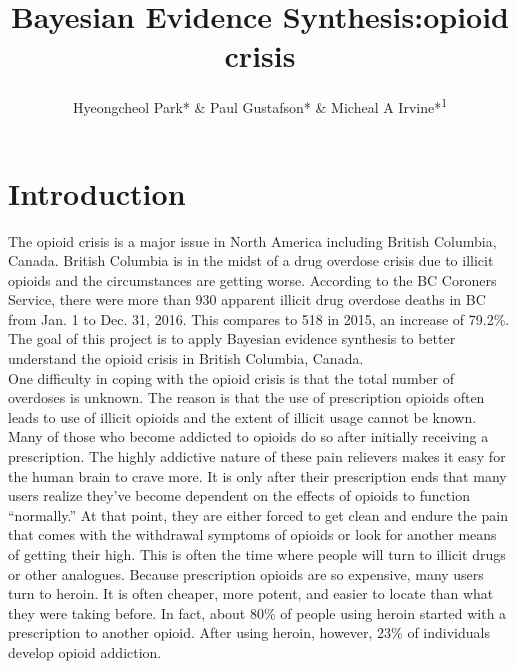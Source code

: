 \documentclass[12pt]{article}
\title{Bayesian Evidence Synthesis:opioid crisis}
\author{Hyeongcheol Park* \& Paul Gustafson* \& Micheal A Irvine*\textsuperscript{1}}
\begin{document}
\maketitle{}
\tableofcontents %
\listoffigures %
\listoftables %
\doublespacing

\begin{abstract}

\end{abstract}

\section{Introduction}
The opioid crisis is a major issue in North America including British Columbia, Canada. British Columbia is in the midst of a drug overdose crisis due to illicit opioids and the circumstances are getting worse. According to the BC Coroners Service, there were more than 930 apparent illicit drug overdose deaths in BC from Jan. 1 to Dec. 31, 2016. This compares to 518 in 2015, an increase of 79.2\%. \cite{bccdc_opioid}  The goal of this project is to apply Bayesian evidence synthesis to better understand the opioid crisis in British Columbia, Canada.  \\ 

One difficulty in coping with the opioid crisis is that the total number of overdoses is unknown. The reason is that the use of prescription opioids often leads to use of illicit opioids and the extent of illicit usage cannot be known. Many of those who become addicted to opioids do so after initially receiving a prescription. The highly addictive nature of these pain relievers makes it easy for the human brain to crave more. It is only after their prescription ends that many users realize they’ve become dependent on the effects of opioids  to function “normally.” At that point, they are either forced to get clean and endure the pain that comes with the withdrawal symptoms of opioids or look for another means of getting their high. This is often the time where people will turn to illicit drugs or other analogues. Because prescription opioids are so expensive,  many users turn to heroin. It is often cheaper, more potent, and easier to locate than what they were taking before. In fact, about 80\% of people using heroin started with a prescription to another opioid. After using heroin, however, 23\% of individuals develop opioid addiction.\cite{opioid_desc} \\
\end{document}
